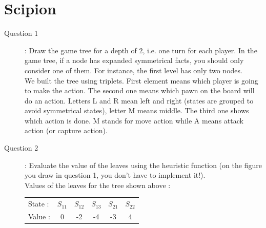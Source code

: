 

\usepackage{lipsum}




\tableofcontents
\thispagestyle{empty}	%
\newpage
{} %

\section{Scipion}
\begin{description}
\item[Question 1] : Draw the game tree for a depth of 2, i.e. one turn for each player. In the game tree, if a node has expanded symmetrical facts, you should only consider one of them. For instance, the first level has only two nodes.\\ 
We built the tree using triplets. First element means which player is going to make the action. The second one means which pawn on the board will do an action. Letters L and R mean left and right (states are grouped to avoid symmetrical states), letter M means middle. The third one shows which action is done. M stands for move action while A means attack action (or capture action).\\
\item [Question 2]: Evaluate the value of the leaves using the heuristic function (on the figure you draw in question 1, you don’t have to implement it!).\\
Values of the leaves for the tree shown above : \\
\begin{center}
\begin{tabular}{|l|c|c|c|c|c|}
\hline
State : & $S_{11}$ & $S_{12}$& $S_{13}$& $S_{21}$& $S_{22}$\\
Value : & 0 & -2 & -4 & -3 & 4\\
\hline


\end{tabular}
\end{center}
\end{description}
